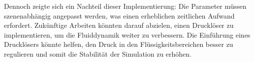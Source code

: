 \documentclass[a4paper, 12pt]{article}
\begin{document}
Dennoch zeigte sich ein Nachteil dieser Implementierung: Die Parameter müssen szenenabhängig angepasst werden, was einen erheblichen zeitlichen Aufwand erfordert. Zukünftige Arbeiten könnten darauf abzielen, einen Drucklöser zu implementieren, um die Fluiddynamik weiter zu verbessern. Die Einführung eines Drucklösers könnte helfen, den Druck in den Flüssigkeitsbereichen besser zu regulieren und somit die Stabilität der Simulation zu erhöhen.

\newpage
\nocite{*}
\printbibliography[title={Bibliographie}]
\end{document}
